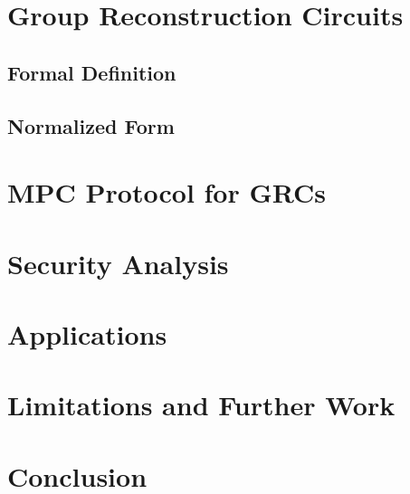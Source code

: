 \section{Group Reconstruction Circuits}

\subsection{Formal Definition}

\subsection{Normalized Form}

\section{MPC Protocol for GRCs}

\section{Security Analysis}

\section{Applications}

\section{Limitations and Further Work}

\section{Conclusion}


\small 

